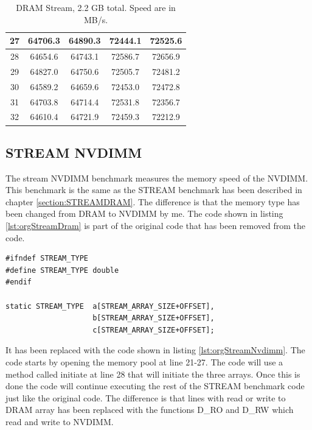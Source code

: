 \documentclass[12pt,a4paper,USenglish]{article}      %
\begin{document}
\begin{table}[!hbtp]
\begin{tabular}{ |c|c|c|c|c| }
\hline
27 & 64706.3 & 64890.3 & 72444.1 & 72525.6 \\
\hline
28 & 64654.6 & 64743.1 & 72586.7 & 72656.9 \\
\hline
29 & 64827.0 & 64750.6 & 72505.7 & 72481.2 \\
\hline
30 & 64589.2 & 64659.6 & 72453.0 & 72472.8 \\
\hline
31 & 64703.8 & 64714.4 & 72531.8 & 72356.7 \\
\hline
32 & 64610.4 & 64721.9 & 72459.3 & 72212.9 \\
\hline
\end{tabular}
\caption{DRAM Stream, 2.2 GB total. Speed are in MB/s.}
\label{tab:DRAM_STREAM_100M_Table}
\end{table}

\subsection{STREAM NVDIMM}
\label{section:STREAM_NVDIMM}
The stream NVDIMM benchmark measures the memory speed of the NVDIMM. This benchmark is the same as the STREAM benchmark has been described in chapter \ref{section:STREAMDRAM}. The difference is that the memory type has been changed from DRAM to NVDIMM by me.
The code shown in listing \ref{lst:orgStreamDram} is part of the original code that has been removed from the code.
\begin{lstlisting}[caption={Original STREAM benchmark code at line 175-181.}, label={lst:orgStreamDram}]
#ifndef STREAM_TYPE
#define STREAM_TYPE double
#endif

static STREAM_TYPE  a[STREAM_ARRAY_SIZE+OFFSET],
                    b[STREAM_ARRAY_SIZE+OFFSET],
                    c[STREAM_ARRAY_SIZE+OFFSET];
\end{lstlisting}
It has been replaced with the code shown in listing \ref{lst:orgStreamNvdimm}. The code starts by opening the memory pool at line 21-27. The code will use a method called initiate at line 28 that will initiate the three arrays. Once this is done the code will continue executing the rest of the STREAM benchmark code just like the original code. The difference is that lines with read or write to DRAM array has been replaced with the functions D\_RO and D\_RW which read and write to NVDIMM.
\end{document}
